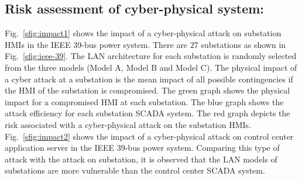 \subsection{Risk assessment of cyber-physical system:} 
Fig.~\ref{sfig:impact1} shows the impact of a cyber-physical attack on substation HMIs in the IEEE 39-bus power system. There are $27$ substations as shown in Fig.~\ref{sfig:ieee-39}. The LAN architecture for each substation is randomly selected from the three models (Model A, Model B and Model C). The physical impact of a cyber attack at a substation is the mean impact of all possible contingencies if the HMI of the substation is compromised. The green graph shows the physical impact for a compromised HMI at each substation. The blue graph shows the attack efficiency for each substation SCADA system. The red graph depicts the risk associated with a cyber-physical attack on the substation HMIs. Fig.~\ref{sfig:impact2} shows the impact of a cyber-physical attack on control center application server in the IEEE 39-bus power system. Comparing this type of attack with the attack on substation, it is observed that the LAN models of substations are more vulnerable than the control center SCADA system.
